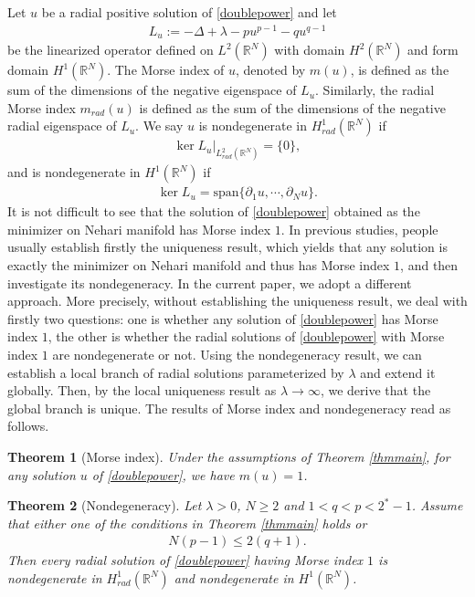 \documentclass{article}
\newtheorem{theorem}{Theorem}[section]
\theoremstyle{definition} \theoremstyle{remark}
\numberwithin{equation}{section}
\newcommand{\R}{\mathbb{R}}
\newcommand{\la}{\lambda}
\begin{document}
		Let $u$ be a radial positive solution of \eqref{doublepower} and let
		\begin{align*}
			L_u := -\Delta + \la - pu^{p-1} - qu^{q-1}
		\end{align*}
		be the linearized operator defined on $L^2(\R^N)$ with domain $H^2(\R^N)$ and form domain $H^1(\R^N)$. The Morse index of $u$, denoted by $m(u)$, is defined as the sum of the dimensions of the negative eigenspace of $L_u$. Similarly, the radial Morse index $m_{rad}(u)$ is defined as the sum of the dimensions of the negative radial eigenspace of $L_u$. We say $u$ is nondegenerate in $H^1_{rad}(\R^N)$ if
		\begin{align*}
			\ker L_u|_{L^2_{rad}(\R^N)} = \{0\},
		\end{align*}
		and is nondegenerate in $H^1(\R^N)$ if
		\begin{align*}
			\ker L_u = \text{span}\big\{\partial_1 u, \cdots, \partial_N u\big\}.
		\end{align*}
		It is not difficult to see that the solution of \eqref{doublepower} obtained as the minimizer on Nehari manifold has Morse index $1$. In previous studies, people usually establish  firstly the uniqueness result, which yields that any solution is exactly the minimizer on Nehari manifold and thus has Morse index $1$, and then investigate its nondegeneracy. In the current paper, we adopt a different approach. More precisely,  without establishing the uniqueness result, we deal with firstly  two questions:  one is whether any solution of \eqref{doublepower} has Morse index $1$, the other is whether the radial solutions of \eqref{doublepower}  with Morse index $1$ are nondegenerate or not. Using the nondegeneracy result, we can establish a local branch of radial solutions parameterized by $\la$ and extend it globally. Then, by the local uniqueness result as $\la \to \infty$, we derive that the global branch is unique. The results of Morse index and nondegeneracy read as follows.

		\begin{theorem}[Morse index] \label{thmMorse}
			Under the assumptions of Theorem \ref{thmmain}, for any solution $u$ of \eqref{doublepower}, we have $m(u) = 1$.
		\end{theorem}

		\begin{theorem}[Nondegeneracy] \label{thmnondegenerate}
			Let $\la > 0$, $N \ge 2$ and $1 < q < p < 2^*-1$. Assume that either one of the conditions in Theorem \ref{thmmain} holds or
			\begin{align*}
				N(p-1) \le 2(q+1).
			\end{align*}
		Then every radial solution of \eqref{doublepower} having Morse index $1$ is nondegenerate in $H^1_{rad}(\R^N)$ and nondegenerate in $H^1(\R^N)$.
		\end{theorem}
\end{document}

